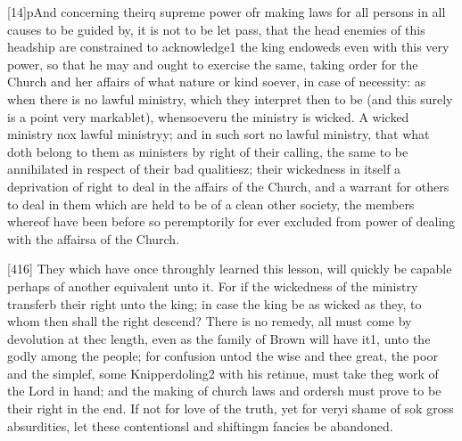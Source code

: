 [14]pAnd concerning theirq supreme power ofr making laws for all persons in all causes to be guided by, it is not to be let pass, that the head enemies of this headship are constrained to acknowledge1 the king endoweds even with this very power, so that he may and ought to exercise the same, taking order for the Church and her affairs of what nature or kind soever, in case of necessity: as when there is no lawful ministry, which they interpret then to be (and this surely is a point very markablet), whensoeveru the ministry is wicked. A wicked ministry nox lawful ministryy; and in such sort no lawful ministry, that what doth belong to them as ministers by right of their calling, the same to be annihilated in respect of their bad qualitiesz; their wickedness in itself a deprivation of right to deal in the affairs of the Church, and a warrant for others to deal in them which are held to be of a clean other society, the members whereof have been before so peremptorily for ever excluded from power of dealing with the affairsa of the Church.

[416]
They which have once throughly learned this lesson, will quickly be capable perhaps of another equivalent unto it. For if the wickedness of the ministry transferb their right unto the king; in case the king be as wicked as they, to whom then shall the right descend? There is no remedy, all must come by devolution at thec length, even as the family of Brown will have it1, unto the godly among the people; for confusion untod the wise and thee great, the poor and the simplef, some Knipperdoling2 with his retinue, must take theg work of the Lord in hand; and the making of church laws and ordersh must prove to be their right in the end. If not for love of the truth, yet for veryi shame of sok gross absurdities, let these contentionsl and shiftingm fancies be abandoned.

